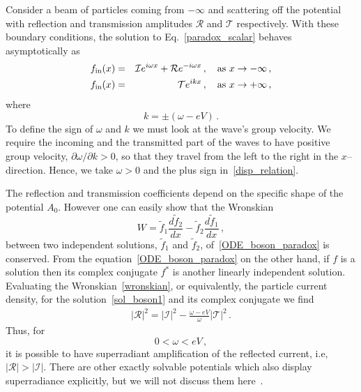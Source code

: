 \documentclass[11pt]{article}
\newcommand{\be}{\begin{equation}}
\newcommand{\ee}{\end{equation}}
\newcommand{\bea}{\begin{eqnarray}}
\newcommand{\eea}{\end{eqnarray}}
\newcommand{\nn}{\nonumber}
\numberwithin{equation}{section} %
\begin{document}
Consider a beam of particles coming from $-\infty$ and scattering off the potential with reflection and transmission amplitudes $\mathcal{R}$ and $\mathcal{T}$ respectively. With these boundary conditions, the solution to Eq.~\eqref{paradox_scalar} behaves asymptotically as
%
\bea
\label{sol_boson1}
f_{\rm in}(x)&=&\mathcal{I} e^{i\omega x}+\mathcal{R} e^{-i\omega x}\,, \quad \text{as}\,\, x\to-\infty\,,\nn\\
f_{\rm in}(x)&=&\mathcal{T} e^{ikx}\,, \quad \text{as}\,\, x\to+\infty\,,
\eea
%
where
%
\be\label{disp_relation}
k=\pm(\omega-e V)\,.
\ee
%
To define the sign of $\omega$ and $k$ we must look at the wave's group velocity. We require the incoming and the transmitted part of the waves to have positive group velocity, $\partial\omega/\partial k>0$, so that they travel from the left to the right in the $x$--direction. Hence, we take $\omega>0$ and the plus sign in~\eqref{disp_relation}.

The reflection and transmission coefficients depend on the specific shape of the potential $A_0$. However one can easily show that the Wronskian
%
\be\label{wronskian}
W=\tilde{f}_1 \frac{d\tilde{f}_2}{dx}-\tilde{f}_2\frac{d\tilde{f}_1}{dx}\,,
\ee
%
between two independent solutions, $\tilde{f}_1$ and $\tilde{f}_2$, of~\eqref{ODE_boson_paradox} is conserved.
From the equation~\eqref{ODE_boson_paradox} on the other hand, if $f$ is a solution then its complex conjugate $f^*$ is another linearly independent solution. Evaluating the Wronskian~\eqref{wronskian}, or equivalently, the particle current density, for the solution~\eqref{sol_boson1} and its complex conjugate we find
%
\bea\label{reflection_boson}
\left|\mathcal{R}\right|^2=|\mathcal{I}|^2-\frac{\omega-eV}{\omega}\left|\mathcal{T}\right|^2\,.
\eea
%
Thus, for
%
\be\label{super_klein} 0<\omega<e V\,,
\ee
%
it is possible to have superradiant amplification of the reflected current, i.e, $\left|\mathcal{R}\right|>|\mathcal{I}|$. 
There are other exactly solvable potentials which also display superradiance explicitly, but we will not discuss them here~\cite{Puente:2019qin}.
\end{document}
